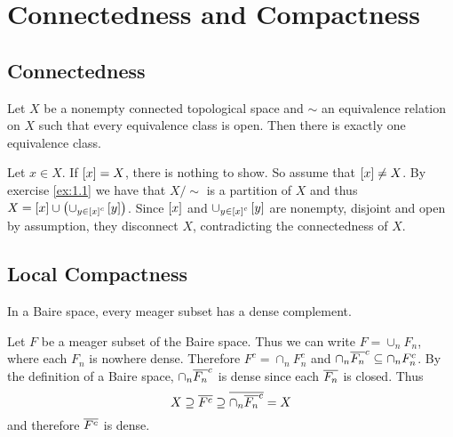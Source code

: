 \chapter{Connectedness and Compactness}
\section{Connectedness}
\begin{exercise}
Let $X$ be a nonempty connected topological space and $\sim$ an equivalence relation on $X$ such that every equivalence class is open. Then there is exactly one equivalence class.
\end{exercise}

\begin{solution}
Let $x \in X$. If $\eqclass{x} = X$, there is nothing to show. So assume that $\eqclass{x} \neq X$. By exercise \ref{ex:1.1} we have that $X/{\sim}$ is a partition of $X$ and thus $X = \eqclass{x} \cup \del[1]{\cup_{y \in \eqclass{x}^c}\eqclass{y}}$. Since $\eqclass{x}$ and $\cup_{y \in \eqclass{x}^c}\eqclass{y}$ are nonempty, disjoint and open by assumption, they disconnect $X$, contradicting the connectedness of $X$.
\end{solution}

\section{Local Compactness}

\begin{exercise}
In a Baire space, every meager subset has a dense complement.
\end{exercise}

\begin{solution}
Let $F$ be a meager subset of the Baire space. Thus we can write $F = \cup_n F_n$, where each $F_n$ is nowhere dense. Therefore $F^c = \cap_n F_n^c$ and $\cap_n \overline{F_n}^c \subseteq \cap_n F_n^c$. By the definition of a Baire space, $\cap_n \overline{F_n}^c$ is dense since each $\overline{F_n}$ is closed. Thus 
\begin{equation*}
X \supseteq \overline{F^c} \supseteq \overline{\cap_n \overline{F_n}^c} = X
\end{equation*}
\noindent and therefore $\overline{F^c}$ is dense.
\end{solution}